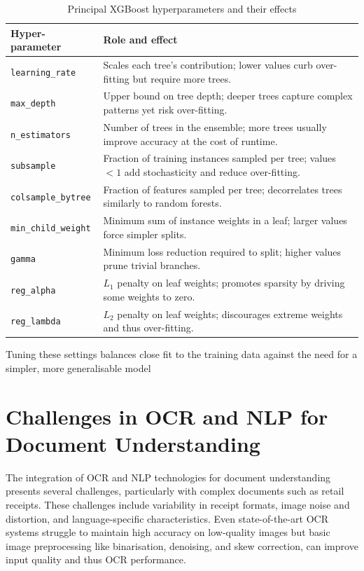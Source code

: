 \documentclass{SGGW-thesis-EN}
\begin{document}
\begin{table}[h]
  \centering
  \caption{Principal XGBoost hyperparameters and their effects}\label{tab:xgboost_hyperparameters}
  \begin{tabularx}{\textwidth}{@{}lX@{}}
    \toprule
    \textbf{Hyper-parameter} & \textbf{Role and effect} \\ 
    \midrule
    \texttt{learning\_rate}    & Scales each tree’s contribution; lower values curb over-fitting but require more trees. \\ 
    \texttt{max\_depth}        & Upper bound on tree depth; deeper trees capture complex patterns yet risk over-fitting. \\ 
    \texttt{n\_estimators}     & Number of trees in the ensemble; more trees usually improve accuracy at the cost of runtime. \\ 
    \texttt{subsample}         & Fraction of training instances sampled per tree; values $<1$ add stochasticity and reduce over-fitting. \\ 
    \texttt{colsample\_bytree} & Fraction of features sampled per tree; decorrelates trees similarly to random forests. \\ 
    \texttt{min\_child\_weight} & Minimum sum of instance weights in a leaf; larger values force simpler splits. \\ 
    \texttt{gamma}             & Minimum loss reduction required to split; higher values prune trivial branches. \\ 
    \texttt{reg\_alpha}        & $L_{1}$ penalty on leaf weights; promotes sparsity by driving some weights to zero. \\ 
    \texttt{reg\_lambda}       & $L_{2}$ penalty on leaf weights; discourages extreme weights and thus over-fitting. \\ 
    \bottomrule
  \end{tabularx}
\end{table}
Tuning these settings balances close fit to the training data against the need for a simpler,
more generalisable model

\section{Challenges in OCR and NLP for Document Understanding}

The integration of OCR and NLP technologies for document understanding presents several
challenges, particularly with complex documents such as retail receipts.
These challenges include variability in receipt formats, image noise and distortion, and
language-specific characteristics.
Even state-of-the-art OCR systems struggle to maintain high accuracy on low-quality images but
basic image preprocessing like binarisation, denoising, and skew correction, can improve
input quality and thus OCR performance.
\end{document}
